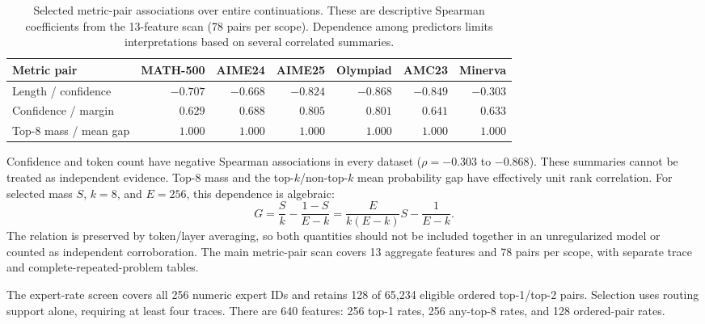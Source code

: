 \begin{table}[t]
\centering
\footnotesize
\caption{Selected metric-pair associations over entire continuations. These are descriptive Spearman coefficients from the 13-feature scan (78 pairs per scope). Dependence among predictors limits interpretations based on several correlated summaries. }
\label{tab:qwen-corr-pairs}
\begin{tabular}{@{}lrrrrrr@{}}
\toprule
Metric pair & MATH-500 & AIME24 & AIME25 & Olympiad & AMC23 & Minerva \\
\midrule
Length / confidence & $-0.707$ & $-0.668$ & $-0.824$ & $-0.868$ & $-0.849$ & $-0.303$ \\
Confidence / margin & $0.629$ & $0.688$ & $0.805$ & $0.801$ & $0.641$ & $0.633$ \\
Top-8 mass / mean gap & $1.000$ & $1.000$ & $1.000$ & $1.000$ & $1.000$ & $1.000$ \\
\bottomrule
\end{tabular}
\end{table}

Confidence and token count have negative Spearman associations in every
dataset ($\rho=-0.303$ to $-0.868$). These summaries cannot be treated as
independent evidence. Top-8 mass and the top-$k$/non-top-$k$ mean probability
gap have effectively unit rank correlation. For selected mass $S$, $k=8$,
and $E=256$, this dependence is algebraic:
\begin{equation}
 G=\frac{S}{k}-\frac{1-S}{E-k}
   =\frac{E}{k(E-k)}S-\frac{1}{E-k}.
\end{equation}
The relation is preserved by token/layer averaging, so both quantities should
not be included together in an unregularized model or counted as independent
corroboration. The main metric-pair scan covers 13 aggregate features and 78
pairs per scope, with separate trace and complete-repeated-problem tables.

The expert-rate screen covers all 256 numeric expert IDs and retains 128 of
65,234 eligible ordered top-1/top-2 pairs. Selection uses routing support
alone, requiring at least four traces. There are 640 features: 256 top-1
rates, 256 any-top-8 rates, and 128 ordered-pair rates.

